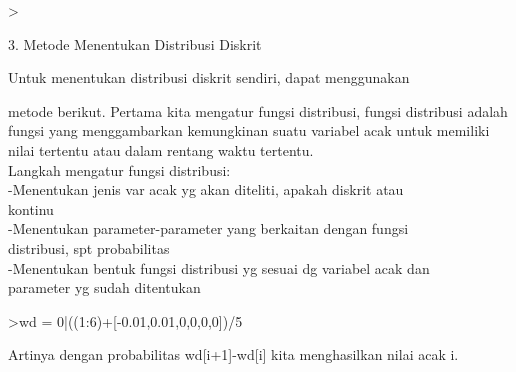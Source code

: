 \documentclass[a4paper,10pt]{article}
\begin{document}
\begin{eulernotebook}
\begin{eulercomment}
\begin{eulercomment}
\begin{eulercomment}
\begin{eulercomment}
\begin{eulercomment}
\begin{eulercomment}
\begin{eulercomment}
\end{eulercomment}
\begin{eulerprompt}
> 
\end{eulerprompt}
\eulersubheading{}
\begin{eulercomment}
3. Metode Menentukan Distribusi Diskrit

\end{eulercomment}
\begin{eulerttcomment}
      Untuk menentukan distribusi diskrit sendiri, dapat menggunakan
\end{eulerttcomment}
\begin{eulercomment}
metode berikut. Pertama kita mengatur fungsi distribusi, fungsi
distribusi adalah fungsi yang menggambarkan kemungkinan suatu variabel
acak untuk memiliki nilai tertentu atau dalam rentang waktu tertentu.\\
Langkah mengatur fungsi distribusi:\\
-Menentukan jenis var acak yg akan diteliti, apakah diskrit atau\\
kontinu\\
-Menentukan parameter-parameter yang berkaitan dengan fungsi\\
distribusi, spt probabilitas\\
-Menentukan bentuk fungsi distribusi yg sesuai dg variabel acak dan\\
parameter yg sudah ditentukan
\end{eulercomment}
\begin{eulerprompt}
>wd = 0|((1:6)+[-0.01,0.01,0,0,0,0])/5
\end{eulerprompt}
\begin{euleroutput}
  [0,  0.198,  0.402,  0.6,  0.8,  1,  1.2]
\end{euleroutput}
\begin{eulercomment}
Artinya dengan probabilitas wd[i+1]-wd[i] kita menghasilkan nilai acak
i.


\end{eulercomment}
\end{eulercomment}
\end{eulercomment}
\end{eulercomment}
\end{eulercomment}
\end{eulercomment}
\end{eulercomment}
\end{eulernotebook}
\end{document}
